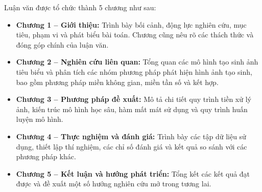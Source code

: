 Luận văn được tổ chức thành 5 chương như sau:

\begin{itemize}
	\item \textbf{Chương 1 – Giới thiệu:} Trình bày bối cảnh, động lực nghiên cứu, mục tiêu, phạm vi và phát biểu bài toán. Chương cũng nêu rõ các thách thức và đóng góp chính của luận văn.
	
	\item \textbf{Chương 2 – Nghiên cứu liên quan:} Tổng quan các mô hình tạo sinh ảnh tiêu biểu và phân tích các nhóm phương pháp phát hiện hình ảnh tạo sinh, bao gồm phương pháp miền không gian, miền tần số và kết hợp.
	
	\item \textbf{Chương 3 – Phương pháp đề xuất:} Mô tả chi tiết quy trình tiền xử lý ảnh, kiến trúc mô hình học sâu, hàm mất mát sử dụng và quy trình huấn luyện mô hình.
	
	\item \textbf{Chương 4 – Thực nghiệm và đánh giá:} Trình bày các tập dữ liệu sử dụng, thiết lập thí nghiệm, các chỉ số đánh giá và kết quả so sánh với các phương pháp khác.
	
	\item \textbf{Chương 5 – Kết luận và hướng phát triển:} Tổng kết các kết quả đạt được và đề xuất một số hướng nghiên cứu mở trong tương lai.
\end{itemize}









